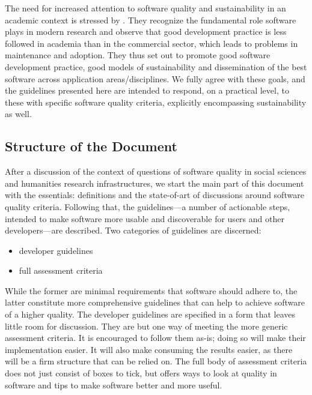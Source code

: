 \documentclass[a4paper,11pt]{article}
\begin{document}
The need for increased attention to software quality and sustainability in an
academic context is stressed by
\cite{RESEARCHSOFTWARE}.
They recognize the fundamental role software plays in modern research and
observe that good development practice is less followed in academia than in the
commercial sector, which leads to problems in maintenance and adoption. They
thus set out to promote good software development practice, good models of
sustainability and dissemination of the best software across application
areas/disciplines. We fully agree with these goals, and the guidelines
presented here are intended to respond, on a practical level, to these with
specific software quality criteria, explicitly encompassing sustainability as
well.

\subsection{Structure of the Document}\label{sec:struc}

After a discussion of the context of questions of software quality in social
sciences and humanities research infrastructures, we start the main part of
this document with the essentials: definitions and the state-of-art of
discussions around software quality criteria.  Following that, the
guidelines---a number of actionable steps, intended to make software more
usable and discoverable for users and other developers---are described. Two
categories of guidelines are discerned: 

\begin{itemize}
	\item developer guidelines
	\item full assessment criteria 
\end{itemize}

While the former are minimal requirements that software should adhere to, the
latter constitute more comprehensive guidelines that can help to achieve software of
a higher quality. The developer guidelines are specified in a form that leaves little
room for discussion. They are but one way of meeting the more generic
assessment criteria. It is encouraged to follow them as-is; doing so will make their
implementation easier. It will also make consuming the results easier, as there
will be a firm structure that can be relied on.  The full body of assessment
criteria does not just consist of boxes to tick, but offers ways to look at quality in software and tips to make software
better and more useful. 
\end{document}
